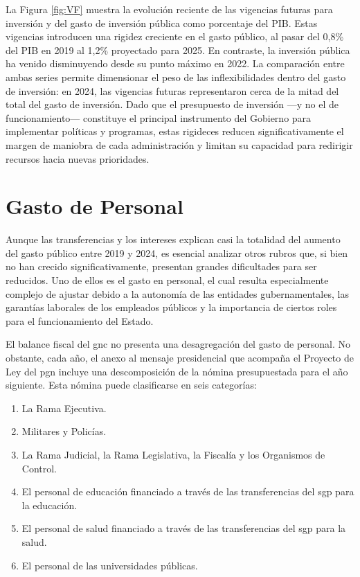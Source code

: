 La Figura \ref{fig:VF} muestra la evolución reciente de las vigencias futuras para inversión y del gasto de inversión pública como porcentaje del PIB. Estas vigencias introducen una rigidez creciente en el gasto público, al pasar del 0,8\% del PIB en 2019 al 1,2\% proyectado para 2025. En contraste, la inversión pública ha venido disminuyendo desde su punto máximo en 2022. La comparación entre ambas series permite dimensionar el peso de las inflexibilidades dentro del gasto de inversión: en 2024, las vigencias futuras representaron cerca de la mitad del total del gasto de inversión. Dado que el presupuesto de inversión —y no el de funcionamiento— constituye el principal instrumento del Gobierno para implementar políticas y programas, estas rigideces reducen significativamente el margen de maniobra de cada administración y limitan su capacidad para redirigir recursos hacia nuevas prioridades.

\section{Gasto de Personal}

Aunque las transferencias y los intereses explican casi la totalidad del aumento del gasto público entre 2019 y 2024, es esencial analizar otros rubros que, si bien no han crecido significativamente, presentan grandes dificultades para ser reducidos. Uno de ellos es el gasto en personal, el cual resulta especialmente complejo de ajustar debido a la autonomía de las entidades gubernamentales, las garantías laborales de los empleados públicos y la importancia de ciertos roles para el funcionamiento del Estado.

El balance fiscal del \gls{gnc} no presenta una desagregación del gasto de personal. No obstante, cada año, el anexo al mensaje presidencial que acompaña el Proyecto de Ley del \gls{pgn} incluye una descomposición de la nómina presupuestada para el año siguiente. Esta nómina puede clasificarse en seis categorías:

\begin{enumerate}[nosep]
  \item La Rama Ejecutiva.
  \item Militares y Policías.
  \item La Rama Judicial, la Rama Legislativa, la Fiscalía y los Organismos de Control.
  \item El personal de educación financiado a través de las transferencias del \gls{sgp} para la educación. 
  \item El personal de salud financiado a través de las transferencias del \gls{sgp} para la salud.
  \item El personal de las universidades públicas.
\end{enumerate}

